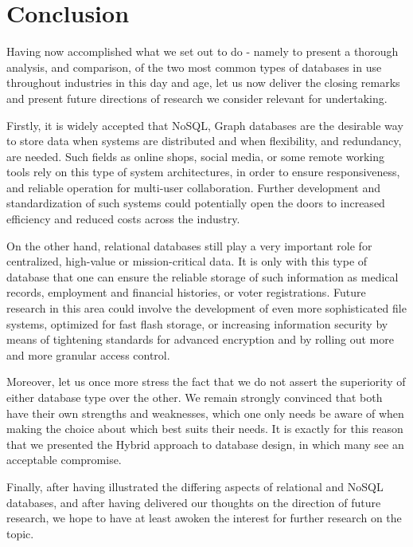 \documentclass[10pt,        %
               a4paper,     %
               journal,     %
               ]{IEEEtran}
\begin{document}
\section{Conclusion}
Having now accomplished what we set out to do - namely to present a thorough analysis, and comparison, of the two most common types of databases in use throughout industries in this day and age, let us now deliver the closing remarks and present future directions of research we consider relevant for undertaking. \par
Firstly, it is widely accepted that NoSQL, Graph databases are the desirable way to store data  when systems are distributed and when flexibility, and redundancy, are needed. Such fields as online shops, social media, or some remote working tools rely on this type of system architectures, in order to ensure responsiveness, and reliable operation for multi-user collaboration. Further development and standardization of such systems could potentially open the doors to increased efficiency and reduced costs across the industry. \par
On the other hand, relational databases still play a very important role for centralized, high-value or mission-critical data. It is only with this type of database that one can ensure the reliable storage of such information as medical records, employment and financial histories, or voter registrations. Future research in this area could involve the development of even more sophisticated file systems, optimized for fast flash storage, or increasing information security by means of tightening standards for advanced encryption and by rolling out more and more granular access control. \par 
Moreover, let us once more stress the fact that we do not assert the superiority of either database type over the other. We remain strongly convinced that both have their own strengths and weaknesses, which one only needs be aware of when making the choice about which best suits their needs. It is exactly for this reason that we presented the Hybrid approach to database design, in which many see an acceptable compromise. \par
Finally, after having illustrated the differing aspects of relational and NoSQL databases, and after having delivered our thoughts on the direction of future research, we hope to have at least awoken the interest for further research on the topic. 

\end{document}
